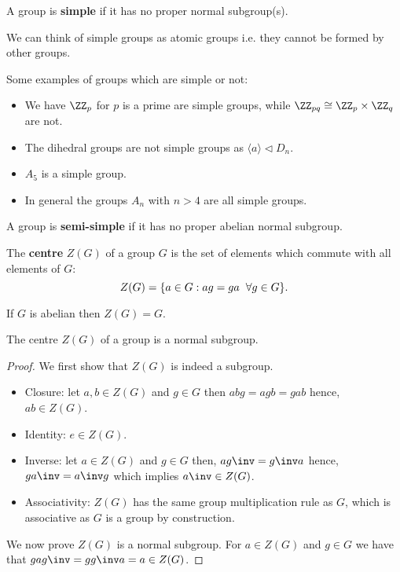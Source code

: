 \documentclass[12pt, a4paper]{article}
\begin{document}
\begin{definition}
    A group is \textbf{simple} if it has no proper normal subgroup(s).
\end{definition}

\begin{mdnote}
    We can think of simple groups as atomic groups i.e. they cannot be formed by other groups.
\end{mdnote}

\begin{example}
    Some examples of groups which are simple or not:
    \begin{itemize}
        \item We have \(\ZZ_p\) for \(p\) is a prime are simple groups, while \(\ZZ_{pq} \cong \ZZ_p \times \ZZ_q\) are not.
        \item The dihedral groups are not simple groups as \(\langle a \rangle \triangleleft D_n\).
        \item \(A_5\) is a simple group.
        \item In general the groups \(A_n\) with \(n>4\) are all simple groups.
    \end{itemize}
\end{example}

\begin{definition}
    A group is \textbf{semi-simple} if it has no proper abelian normal subgroup.
\end{definition}

\begin{definition}
    The \textbf{centre} \(Z(G)\) of a group \(G\) is the set of elements which commute with all elements of \(G\):
    \[
        Z(G) = \{a\in G : ag=ga \hphantom{h} \forall g \in G\}.
    \]
\end{definition}

\begin{example}
    If \(G\) is abelian then \(Z(G)=G\).
\end{example}

\begin{mdthm}
    The centre \(Z(G)\) of a group is a normal subgroup.
\end{mdthm}

\begin{proof}
    We first show that \(Z(G)\) is indeed a subgroup.
    \begin{itemize}
        \item Closure: let \(a,b \in Z(G)\) and \(g \in G\) then \(abg=agb=gab\) hence, \(ab \in Z(G)\).
        \item Identity: \(e \in Z(G)\).
        \item Inverse: let \(a \in Z(G)\) and \(g \in G\) then, \(ag\inv =g\inv a\) hence, \(ga\inv=a\inv g\) which implies \(a\inv \in Z(G)\).
        \item Associativity: \(Z(G)\) has the same group multiplication rule as \(G\), which is associative as \(G\) is a group by construction.
    \end{itemize}
    We now prove \(Z(G)\) is a normal subgroup. For \(a \in Z(G)\) and \(g \in G\) we have that \(gag\inv=gg\inv a=a\in Z(G)\).
\end{proof}
\end{document}
